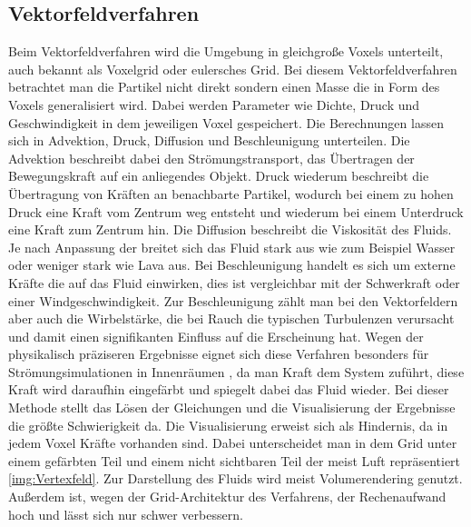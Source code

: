 \documentclass[intern,palatino]{cgBA}
\begin{document}
\subsection{Vektorfeldverfahren}
Beim Vektorfeldverfahren wird die Umgebung in gleichgroße Voxels unterteilt, auch bekannt als Voxelgrid oder eulersches Grid. Bei diesem Vektorfeldverfahren betrachtet man die Partikel nicht direkt sondern einen Masse die in Form des Voxels generalisiert wird. Dabei werden Parameter wie Dichte, Druck und Geschwindigkeit in dem jeweiligen Voxel gespeichert. Die Berechnungen lassen sich in Advektion, Druck, Diffusion und Beschleunigung unterteilen. Die Advektion beschreibt dabei den Strömungstransport, das Übertragen der Bewegungskraft auf ein anliegendes Objekt. Druck wiederum beschreibt die Übertragung von Kräften an benachbarte Partikel, wodurch bei einem zu hohen Druck eine Kraft vom Zentrum weg entsteht und wiederum bei einem Unterdruck eine Kraft zum Zentrum hin. Die Diffusion beschreibt die Viskosität des Fluids. Je nach Anpassung der breitet sich das Fluid stark aus wie zum Beispiel Wasser oder weniger stark wie Lava aus.
Bei Beschleunigung handelt es sich um externe Kräfte die auf das Fluid einwirken, dies ist vergleichbar mit der Schwerkraft oder einer Windgeschwindigkeit. Zur Beschleunigung zählt man bei den Vektorfeldern aber auch die Wirbelstärke, die bei Rauch die typischen Turbulenzen verursacht und damit einen signifikanten Einfluss auf die Erscheinung hat.
\newline
Wegen der physikalisch präziseren Ergebnisse eignet sich diese Verfahren besonders für Strömungsimulationen in Innenräumen \cite{franz}, da man Kraft dem System zuführt, diese Kraft wird daraufhin eingefärbt und spiegelt dabei das Fluid wieder.
\newline
Bei dieser Methode stellt das Lösen der Gleichungen und die Visualisierung der Ergebnisse die größte Schwierigkeit da. Die Visualisierung erweist sich als Hindernis, da in jedem Voxel Kräfte vorhanden sind. Dabei unterscheidet man in dem Grid unter einem gefärbten Teil und einem nicht sichtbaren Teil der meist Luft repräsentiert \ref{img:Vertexfeld}. Zur Darstellung des Fluids wird meist Volumerendering genutzt. Außerdem ist, wegen der Grid-Architektur des Verfahrens, der Rechenaufwand hoch und lässt sich nur schwer verbessern.
\end{document}
